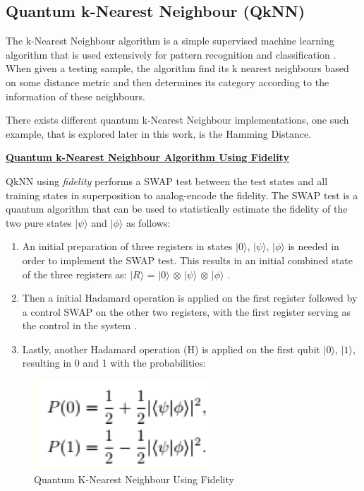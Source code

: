 \subsection{Quantum k-Nearest Neighbour (QkNN)}\label{QkNNexplain}

The k-Nearest Neighbour algorithm is a simple supervised machine learning algorithm that is used extensively for pattern recognition and classification \citep{kNNToward}. When  given a testing sample, the algorithm find its k nearest neighbours based on some distance metric and then determines its category according to the information of these neighbours. 

There exists different quantum k-Nearest Neighbour implementations, one such example, that is explored later in this work, is the Hamming Distance. %

\vspace{0.4cm}
\textbf{\underline{Quantum k-Nearest Neighbour Algorithm Using Fidelity}}

 QkNN using \emph{fidelity} \citep{QKNAll} performs a SWAP test between the test states and all training states in superposition to analog-encode the fidelity. The SWAP test is a quantum algorithm that can be used to statistically estimate the fidelity of the two pure states $\vert\psi\rangle$ and $\vert\phi\rangle$ as follows:

\begin{enumerate}
\item 
An initial preparation of three registers in states $\vert0\rangle$, $\vert\psi\rangle$,  $\vert\phi\rangle$ is needed in order to implement the SWAP test. This results in an initial combined state of the three registers as:  $\vert R\rangle$ = $\vert0\rangle$ $\otimes$ $\vert\psi\rangle$ $\otimes$ $\vert\phi\rangle$ \citep{QML}.
\item
Then a initial Hadamard operation is applied on the first register followed by a control SWAP on the other two registers, with the first register serving as the control in the system \cite{QML}.
\item
 Lastly, another Hadamard operation (H) is applied on the first qubit {$\vert0\rangle$, $\vert1\rangle$}, resulting in 0 and 1 with the probabilities: 
\end{enumerate}
\begin{figure}[h!]
      \centering
      \includegraphics[scale=0.44]{background/KNFid.png}
      \caption{Quantum K-Nearest Neighbour Using Fidelity
      \citep{QML}}
\end{figure}

